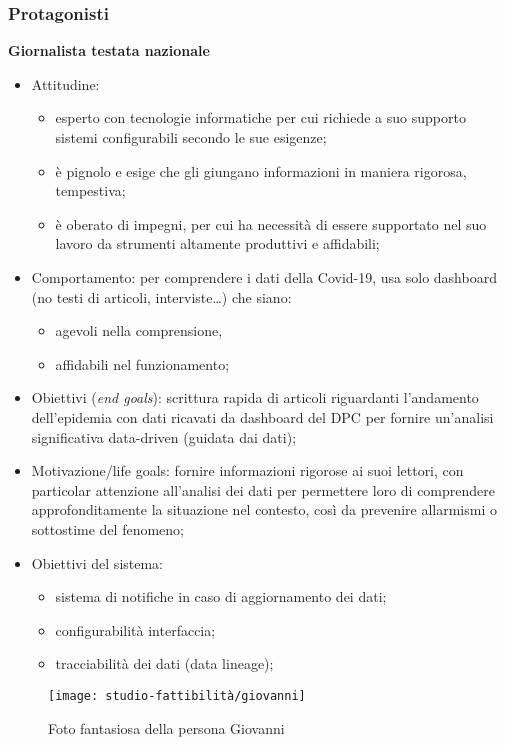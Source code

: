 \subsubsection*{Protagonisti}
\textbf{Giornalista testata nazionale}
\begin{itemize}
	\item Attitudine:
	\begin{itemize}
	\item esperto con tecnologie informatiche per cui richiede a suo supporto sistemi configurabili secondo le sue esigenze;
    \item è pignolo e esige che gli giungano informazioni in maniera rigorosa, tempestiva;
    \item è oberato di impegni, per cui ha necessità di essere supportato nel suo lavoro da strumenti altamente produttivi e affidabili;
    \end{itemize}
    \item Comportamento: per comprendere i dati della Covid-19, usa solo dashboard (no testi di articoli, interviste…) che siano:
	\begin{itemize}
	    \item agevoli nella comprensione,
	    \item affidabili nel funzionamento;
    \end{itemize}
	\item Obiettivi (\textit{end goals}): scrittura rapida di articoli riguardanti l'andamento dell'epidemia con dati ricavati da dashboard del DPC per fornire un'analisi significativa data-driven (guidata dai dati);
	\item Motivazione/life goals: fornire informazioni rigorose ai suoi lettori, con particolar attenzione all'analisi dei dati per permettere loro di comprendere approfonditamente la situazione nel contesto, così da prevenire allarmismi o sottostime del fenomeno;
	\item Obiettivi del sistema:
	\begin{itemize}
	    \item sistema di notifiche in caso di aggiornamento dei dati;
	    \item configurabilità interfaccia;
	    \item tracciabilità dei dati (data lineage);
    \end{itemize}
\end{itemize}

\begin{wrapfigure}{r}{8cm}
    \texttt{[image: studio-fattibilità/giovanni]}
    \caption{Foto fantasiosa della persona Giovanni}
\end{wrapfigure}

